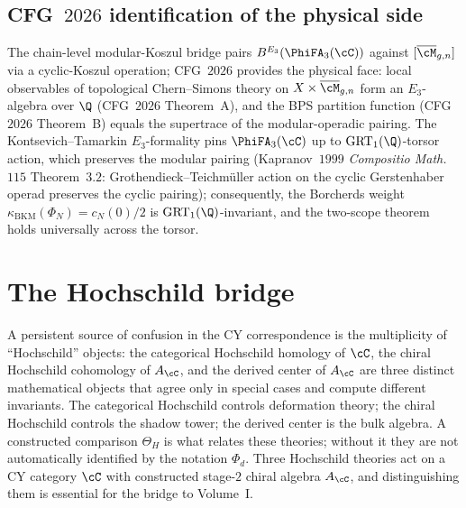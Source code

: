 \subsection{CFG~$2026$ identification of the physical side}

\begin{remark}
\label{rem:cfg-2026-bridge-chapter}
The chain-level modular-Koszul bridge pairs
$B^{E_3}(\PhiFA_3(\cC))$ against $[\overline{\cM}_{g, n}]$ via a
cyclic-Koszul operation; CFG~$2026$ provides the physical face: local
observables of topological Chern--Simons theory on $X \times
\overline{\cM}_{g, n}$ form an $E_3$-algebra over $\Q$ (CFG~$2026$
Theorem~A), and the BPS partition function (CFG~$2026$ Theorem~B)
equals the supertrace of the modular-operadic pairing. The
Kontsevich--Tamarkin $E_3$-formality
\cite{Kontsevich1999LMP,TamarkinAnotherProof} pins
$\PhiFA_3(\cC)$ up to $\mathrm{GRT}_1(\Q)$-torsor action, which
preserves the modular pairing (Kapranov~$1999$ \emph{Compositio
Math.}~$115$ Theorem~$3.2$: Grothendieck--Teichm\"uller action on the
cyclic Gerstenhaber operad preserves the cyclic pairing); consequently,
the Borcherds weight $\kappa_{\mathrm{BKM}}(\Phi_N) = c_N(0)/2$ is
$\mathrm{GRT}_1(\Q)$-invariant, and the two-scope theorem holds
universally across the torsor.
\end{remark}



\section{The Hochschild bridge}
\label{sec:hochschild-bridge}

A persistent source of confusion in the CY correspondence is the multiplicity
of ``Hochschild'' objects: the categorical Hochschild homology of $\cC$,
the chiral Hochschild cohomology of $A_\cC$, and the derived center of
$A_\cC$ are three distinct mathematical objects that agree only in
special cases and compute different invariants. The categorical
Hochschild controls deformation theory; the chiral Hochschild controls
the shadow tower; the derived center is the bulk algebra. A constructed
comparison $\Theta_H$ is what relates these theories; without it they are
not automatically identified by the notation $\Phi_d$. Three Hochschild
theories act on a CY category $\cC$ with constructed stage-$2$ chiral
algebra $A_\cC$, and distinguishing them is essential for the bridge to
Volume~I.

